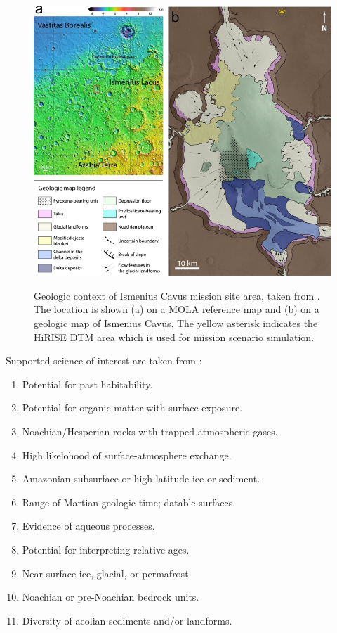 \begin{figure}[h]
  \centering
  \hypersetup{linkcolor=captionTextColor}
  \includegraphics[width=0.6\linewidth]{sections/mars-solar-energy/mission-sites/images/ismenius-cavus.png}\\
  \caption[Geologic context of Ismenius Cavus mission site area]
          {Geologic context of Ismenius Cavus mission site area, taken from . The location is shown (a) on a \ac{MOLA} reference map and (b) on a geologic map of Ismenius Cavus. The yellow asterisk indicates the \ac{HiRISE} \ac{DTM} area which is used for mission scenario simulation.}
  \label{fig:mission-site-ismenius-cavus}
\end{figure}


Supported science of interest are taken from :
\begin{enumerate}[label=\textcolor{BulletBlue}{(\alph*)}]
    \item Potential for past habitability.
    \item Potential for organic matter with surface exposure.
    \item Noachian/Hesperian rocks with trapped atmospheric gases.
    \item High likelohood of surface-atmosphere exchange.
    \item Amazonian subsurface or high-latitude ice or sediment.
    \item Range of Martian geologic time; datable surfaces.
    \item Evidence of aqueous processes.
    \item Potential for interpreting relative ages.
    \item Near-surface ice, glacial, or permafrost.
    \item Noachian or pre-Noachian bedrock units.
    \item Diversity of aeolian sediments and/or landforms.
\end{enumerate}

